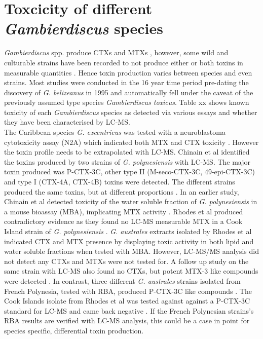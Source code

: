 \documentclass[12pt]{article}
\begin{document}
\section{Toxcicity of different \emph{Gambierdiscus} species}
\emph{Gambierdiscus} spp. produce CTXs and MTXs \cite{murata1990structures,holmes1991strain,satake1993structure,holmes1994purification,satake1996isolation}, however, some wild and culturable strains have been recorded to not produce either or both toxins in measurable quantities \cite{gillespie1985significance,holmes1990toxicity}. Hence toxin production varies between species and even strains. Most studies were conducted in the 16 year time period pre-dating the discovery of \emph{G. belizeanus} in 1995 \cite{faust1995observation} and automatically fell under the caveat of the previously assumed type species \emph{Gambierdiscus toxicus}. Table xx shows known toxicity of each \emph{Gambierdiscus} species as detected via various essays and whether they have been characterised by LC-MS. \\
The Caribbean species \emph{G. excentricus} was tested with a neuroblastoma cytotoxicity assay (N2A) which indicated both MTX and CTX toxicity \cite{fraga2011gambierdiscus}. However the toxin profile needs to be extrapolated with LC-MS.
Chinain et al identified the toxins produced by two strains of \emph{G. polynesiensis} with LC-MS. The major toxin produced was P-CTX-3C, other type II (M-seco-CTX-3C, 49-epi-CTX-3C) and type I (CTX-4A, CTX-4B) toxins were detected. The different strains produced the same toxins, but at different proportions \cite{chinain2010growth}. In an earlier study, Chinain et al detected toxicity of the water soluble fraction of \emph{G. polynesiensis} in a mouse bioassay (MBA), implicating MTX activity \cite{chinain1999morphology}. Rhodes et al produced contradictory evidence as they found no LC-MS measurable MTX in a Cook Island strain of \emph{G. polynesiensis} \cite{rhodes2014production}.
\emph{G. australes} extracts isolated by Rhodes et al indicated CTX and MTX presence by displaying toxic activity in both lipid and water soluble fractions when tested with MBA. However, LC-MS/MS analysis did not detect any CTXs and MTXs were not tested for. A follow up study on the same strain with LC-MS also found no CTXs, but potent MTX-3 like compounds were detected \cite{rhodes2014production,rhodes2010toxic}. In contrast, three different \emph{G. australes} strains isolated from French Polynesia, tested with RBA, produced P-CTX-3C like compounds \cite{chinain2010growth}. The Cook Islands isolate from Rhodes et al was tested against against a P-CTX-3C standard for LC-MS and came back negative \cite{rhodes2014production}. If the French Polynesian strains's RBA results are verified with LC-MS analysis, this could be a case in point for species specific, differential toxin production. \\
\end{document}
